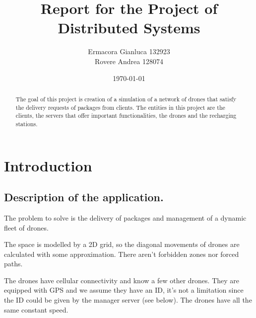 \documentclass[a4paper, oneside]{memoir}
\title{Report for the Project of Distributed Systems}
\author{Ermacora Gianluca 132923\\ Rovere Andrea 128074}
\date{\today}
\begin{document}
\begin{titlingpage}
\maketitle
\begin{abstract}
The goal of this project is creation of a simulation of a network of drones that satisfy the delivery requests of packages from clients. The entities in this project are the clients, the servers that offer important functionalities, the drones and the recharging stations.
\end{abstract}
\end{titlingpage}

\chapter{Introduction}\label{ch:intro}


\section{Description of the application.}
The problem to solve is the delivery of packages and management of a dynamic fleet of drones.

The space is modelled by a 2D grid, so the diagonal movements of drones are calculated with some approximation. There aren't forbidden zones nor forced paths.

The drones have cellular connectivity and know a few other drones. They are equipped with GPS and we assume they have an ID, it's not a limitation since the ID could be given by the manager server (see below). The drones have all the same constant speed.
\end{document}
